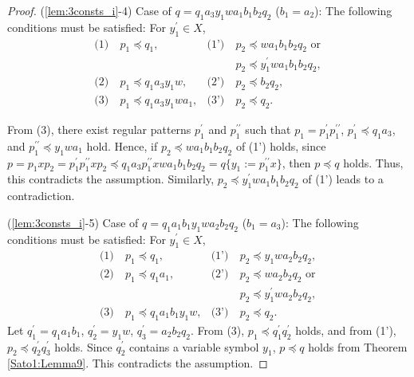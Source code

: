 \begin{proof}
\noindent
(\ref{lem:3consts_i}-4) Case of $q=q_{1}a_{3}y_{1}wa_{1}b_{1}b_{2}q_{2}$ ($b_{1}=a_{2}$):
The following conditions must be satisfied: For $y_{1}^{\prime} \in X$,
\begin{align*}
\textrm{(1)}~& p_{1} \preceq q_{1}, & \textrm{(1')}~& p_{2} \preceq wa_{1}b_{1}b_{2}q_{2} \mbox{ or} \\
& & & p_{2} \preceq y_{1}^{\prime}wa_{1}b_{1}b_{2}q_{2},\\
\textrm{(2)}~& p_{1} \preceq q_{1}a_{3}y_{1}w, & \textrm{(2')}~& p_{2} \preceq b_{2}q_{2}, \\
\textrm{(3)}~& p_{1} \preceq q_{1}a_{3}y_{1}wa_{1}, & \textrm{(3')}~& p_{2} \preceq q_{2}.
\end{align*}

From (3), there exist regular patterns $p_{1}^{\prime}$ and $p_{1}^{\prime\prime}$ such that $p_{1}=p_{1}^{\prime}p_{1}^{\prime\prime}$, $p_{1}^{\prime} \preceq q_{1}a_{3}$, and $p_{1}^{\prime\prime} \preceq y_{1}wa_{1}$ hold.
Hence, if $p_{2} \preceq wa_{1}b_{1}b_{2}q_{2}$ of (1') holds, since $p=p_{1}xp_{2}=p_{1}^{\prime}p_{1}^{\prime\prime}xp_{2}\preceq q_{1}a_{3}p_{1}^{\prime\prime}xwa_{1}b_{1}b_{2}q_{2}=q \{ y_{1} := p_{1}^{\prime\prime}x \}$, then $p \preceq q$ holds.
Thus, this contradicts the assumption.
Similarly, $p_{2} \preceq y_{1}^{\prime}wa_{1}b_{1}b_{2}q_{2}$ of (1') leads to a contradiction.

\smallskip

\noindent
(\ref{lem:3consts_i}-5) Case of $q=q_{1}a_{1}b_{1}y_{1}wa_{2}b_{2}q_{2}$ ($b_{1}=a_{3}$):
The following conditions must be satisfied: For $y_{1}^{\prime} \in X$,
\begin{align*}
\textrm{(1)}~& p_{1} \preceq q_{1}, & \textrm{(1')}~& p_{2} \preceq y_{1}wa_{2}b_{2}q_{2}, \\
\textrm{(2)}~& p_{1} \preceq q_{1}a_{1}, & \textrm{(2')}~& p_{2} \preceq wa_{2}b_{2}q_{2} \mbox{ or} \\
& & & p_{2} \preceq y_{1}^{\prime}wa_{2}b_{2}q_{2},\\
\textrm{(3)}~& p_{1} \preceq q_{1}a_{1}b_{1}y_{1}w, & \textrm{(3')}~& p_{2} \preceq q_{2}.
\end{align*}
\noindent
Let $q_{1}^{\prime}=q_{1}a_{1}b_{1}$, $q_{2}^{\prime}=y_{1}w$, $q_{3}^{\prime}=a_{2}b_{2}q_{2}$.
From (3), $p_{1} \preceq q_{1}^{\prime}q_{2}^{\prime}$ holds, and from (1'), $p_{2} \preceq q_{2}^{\prime}q_{3}^{\prime}$ holds.
Since $q_{2}^{\prime}$ contains a variable symbol $y_{1}$, $p\preceq q$ holds from Theorem \ref{Sato1:Lemma9}.
This contradicts the assumption.
\end{proof}

